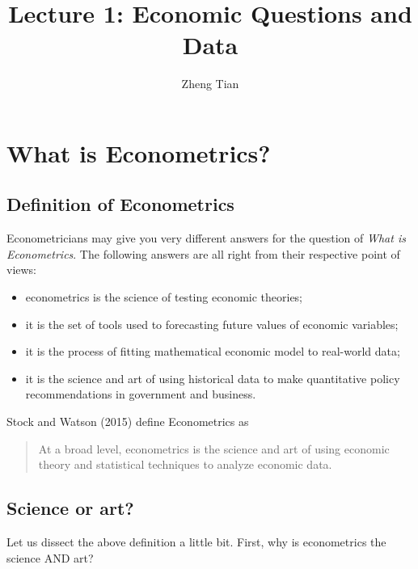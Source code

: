 \documentclass[a4paper,11pt]{article}
\author{Zheng Tian}
\date{}
\title{Lecture 1: Economic Questions and Data}
\begin{document}
\maketitle
\setcounter{tocdepth}{1}
\tableofcontents


\section{What is Econometrics?}
\label{sec:org45137a8}

\subsection*{Definition of Econometrics}
\label{sec:orgc1a579c}

Econometricians may give you very different answers for the question
of \emph{What is Econometrics}. The following answers are all right from
their respective point of views:
\begin{itemize}
\item econometrics is the science of testing economic theories;
\item it is the set of tools used to forecasting future values
of economic variables;
\item it is the process of fitting mathematical economic model
to real-world data;
\item it is the science and art of using historical data to make
quantitative policy recommendations in government and business.
\end{itemize}

Stock and Watson (2015) define Econometrics as
\begin{quote}
At a broad level, econometrics is the science and art of using
economic theory and statistical techniques to analyze economic
data.
\end{quote}


\subsection*{Science or art?}
\label{sec:org4bb1b00}

Let us dissect the above definition a little bit. First, why is
econometrics the science AND art?
\end{document}

